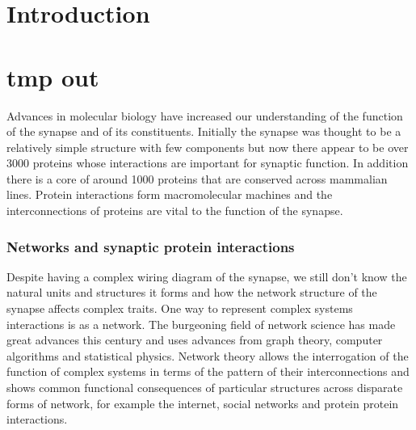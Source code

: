 \section{Introduction}
\section{tmp out}
 
 
 Advances in molecular biology have increased our understanding of the function of the synapse and of its constituents. Initially the synapse was thought to be a relatively simple structure with few components but now there appear to be over 3000 proteins whose interactions are important for synaptic function. In addition there is a core of around 1000 proteins that are conserved across mammalian lines.  Protein interactions form macromolecular machines and the interconnections of proteins are vital to the function of the synapse. 
 \subsubsection{Networks and synaptic protein interactions}
Despite having a complex wiring diagram of the synapse, we still don’t know the natural units and structures it forms and how the network structure of the synapse affects complex traits. One way to represent complex systems interactions is as a network. The burgeoning field of network science has made great advances this century and uses advances from graph theory, computer algorithms and statistical physics. Network theory allows the interrogation of the function of complex systems in terms of the pattern of their interconnections and shows common functional consequences of particular structures across disparate forms of network, for example the internet, social networks and protein protein interactions.

